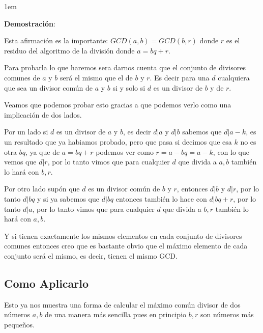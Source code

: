 \documentclass[12pt]{report}                                    %
\newenvironment{SmallIndentation}[1][0.75em]                    %
    {\begin{adjustwidth}{#1}{}\begin{footnotesize}}                 %
    {\end{footnotesize}\end{adjustwidth}}                           %
\begin{document}
        \begin{SmallIndentation}[1em]
            \textbf{Demostración}:

            Esta afirmación es la importante: $GCD(a,b) = GCD(b,r)$ donde $r$ es el residuo
            del algoritmo de la división donde $a=bq+r$.

            Para probarla lo que haremos sera darnos cuenta que el conjunto de divisores
            comunes de $a$ y $b$ será el mismo que el de $b$ y $r$.
            Es decir para una $d$ cualquiera que sea un divisor común de $a$ y $b$ si y solo si
            $d$ es un divisor de $b$ y de $r$.

            Veamos que podemos probar esto gracias a que podemos verlo como una implicación de
            dos lados.

            Por un lado si $d$ es un divisor de $a$ y $b$, es decir $d|a$ y $d|b$
            sabemos que $d|a-k$, es un resultado que ya habiamos probado, pero que
            pasa si decimos que esa $k$ no es otra $bq$, ya que de $a=bq+r$ podemos 
            ver como $r=a-bq = a-k$, con lo que vemos que $d|r$, por lo tanto
            vimos que para cualquier $d$ que divida a $a,b$ también lo hará con $b,r$.

            Por otro lado supón que $d$ es un divisor común de $b$ y $r$, entonces
            $d|b$ y $d|r$, por lo tanto $d|bq$ y si ya sabemos que $d|bq$ entonces
            también lo hace con $d|bq+r$, por lo tanto $d|a$, por lo tanto
            vimos que para cualquier $d$ que divida a $b,r$ también lo hará con $a,b$.

            Y si tienen exactamente los mismos elementos en cada conjunto de divisores
            comunes entonces creo que es bastante obvio que el máximo elemento de cada
            conjunto será el mismo, es decir, tienen el mismo GCD.

        \end{SmallIndentation}


        \clearpage
        \subsection{Como Aplicarlo}

            Esto ya nos muestra una forma de calcular el máximo común divisor de dos
            números $a,b$ de una manera más sencilla pues en principio $b,r$ son
            números más pequeños.
\end{document}
